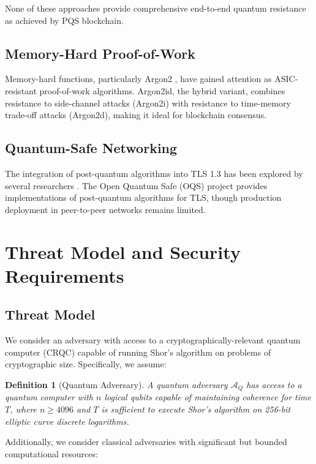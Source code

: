 \documentclass[12pt,a4paper]{article}
\newtheorem{definition}{Definition}
\begin{document}
None of these approaches provide comprehensive end-to-end quantum resistance as achieved by PQS blockchain.

\subsection{Memory-Hard Proof-of-Work}

Memory-hard functions, particularly Argon2 \cite{biryukov2016}, have gained attention as ASIC-resistant proof-of-work algorithms. Argon2id, the hybrid variant, combines resistance to side-channel attacks (Argon2i) with resistance to time-memory trade-off attacks (Argon2d), making it ideal for blockchain consensus.

\subsection{Quantum-Safe Networking}

The integration of post-quantum algorithms into TLS 1.3 has been explored by several researchers \cite{sikeridis2020, paquin2020}. The Open Quantum Safe (OQS) project \cite{oqs2023} provides implementations of post-quantum algorithms for TLS, though production deployment in peer-to-peer networks remains limited.

\section{Threat Model and Security Requirements}

\subsection{Threat Model}

We consider an adversary with access to a cryptographically-relevant quantum computer (CRQC) capable of running Shor's algorithm on problems of cryptographic size. Specifically, we assume:

\begin{definition}[Quantum Adversary]
A quantum adversary $\mathcal{A}_Q$ has access to a quantum computer with $n$ logical qubits capable of maintaining coherence for time $T$, where $n \geq 4096$ and $T$ is sufficient to execute Shor's algorithm on 256-bit elliptic curve discrete logarithms.
\end{definition}

Additionally, we consider classical adversaries with significant but bounded computational resources:
\end{document}
